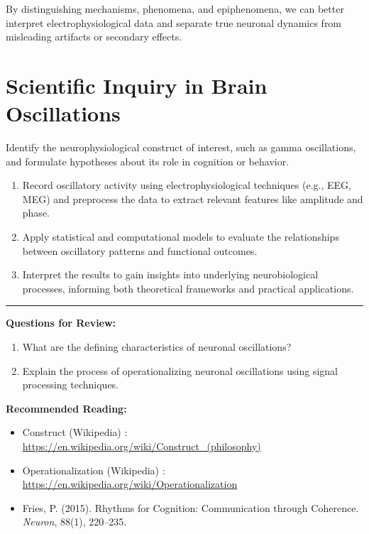 By distinguishing mechanisms, phenomena, and epiphenomena, we can better interpret electrophysiological data and separate true neuronal dynamics from misleading artifacts or secondary effects.


\section{Scientific Inquiry in Brain Oscillations}

Identify the neurophysiological construct of interest, such as gamma oscillations, and formulate hypotheses about its role in cognition or behavior. 

\begin{enumerate}
    \item Record oscillatory activity using electrophysiological techniques (e.g., EEG, MEG) and preprocess the data to extract relevant features like amplitude and phase.
    \item Apply statistical and computational models to evaluate the relationships between oscillatory patterns and functional outcomes.
    \item Interpret the results to gain insights into underlying neurobiological processes, informing both theoretical frameworks and practical applications.
\end{enumerate}


\vspace{10pt}           %
\rule{\linewidth}{0.4pt} %
\vspace{1pt}           %


\textbf{Questions for Review:}
\begin{enumerate}
\item What are the defining characteristics of neuronal oscillations?
\item Explain the process of operationalizing neuronal oscillations using signal processing techniques.
\end{enumerate}

\textbf{Recommended Reading:}
\begin{itemize}
    \item Construct (Wikipedia) \cite{construct_philosophy}:  \href{https://en.wikipedia.org/wiki/Construct_\%28philosophy\%29}{https://en.wikipedia.org/wiki/Construct\_(philosophy)}
    
    \item Operationalization (Wikipedia) \cite{operationalization}:  \href{https://en.wikipedia.org/wiki/Operationalization}{https://en.wikipedia.org/wiki/Operationalization}

    \item Fries, P. (2015). Rhythms for Cognition: Communication through Coherence. \textit{Neuron}, 88(1), 220–235. \cite{fries2015rhythms}
    

\end{itemize}

